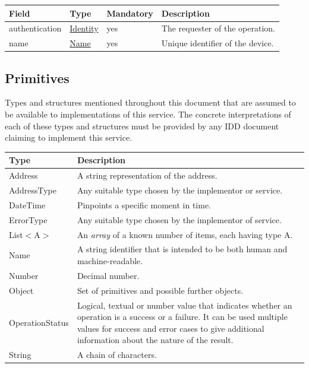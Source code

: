 \documentclass[a4paper]{arrowhead}
\newcommand{\pdef}[1]{{\textcolor{ArrowheadGrey}{#1\label{sec:model:primitives:#1}\label{sec:model:primitives:#1s}\label{sec:model:primitives:#1es}}}}
\newcommand{\pref}[1]{{\textcolor{ArrowheadGrey}{\hyperref[sec:model:primitives:#1]{#1}}}}
\begin{document}
 
\begin{table}[ht!]
\begin{tabularx}{\textwidth}{| p{3cm} | p{3cm} | p{2cm} | X |} \hline
\rowcolor{gray!33} Field & Type & Mandatory & Description \\ \hline
authentication & \hyperref[sec:model:Identity]{Identity} & yes & The requester of the operation. \\ \hline
name & \pref{Name} & yes & Unique identifier of the device. \\ \hline
\end{tabularx}
\end{table}

\subsection{Primitives}
\label{sec:model:primitives}

Types and structures mentioned throughout this document that are assumed to be available to implementations of this service.
The concrete interpretations of each of these types and structures must be provided by any IDD document claiming to implement this service.


\begin{table}[ht!]
\begin{tabularx}{\textwidth}{| p{3cm} | X |} \hline
\rowcolor{gray!33} Type & Description \\ \hline
\pdef{Address}          & A string representation of the address. \\ \hline
\pdef{AddressType}      & Any suitable type chosen by the implementor or service. \\ \hline
\pdef{DateTime}         & Pinpoints a specific moment in time. \\ \hline
\pdef{ErrorType}        & Any suitable type chosen by the implementor of service. \\ \hline
\pdef{List}$<$A$>$      & An \textit{array} of a known number of items, each having type A. \\ \hline
\pdef{Name}             & A string identifier that is intended to be both human and machine-readable. \\ \hline
\pdef{Number}           & Decimal number. \\ \hline
\pdef{Object}           & Set of primitives and possible further objects. \\ \hline
\pdef{OperationStatus}  & Logical, textual or number value that indicates whether an operation is a success or a failure. It can be used multiple values for success and error cases to give additional information about the nature of the result. \\ \hline
\pdef{String}           & A chain of characters. \\ \hline
\end{tabularx}
\end{table}
\end{document}
